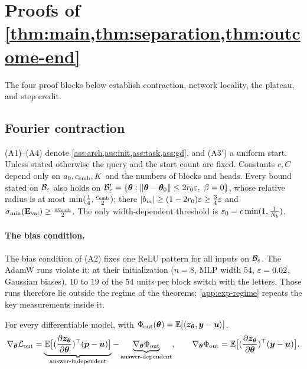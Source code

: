 \section{Proofs of \texorpdfstring{\cref{thm:main,thm:separation,thm:outcome-end}}{Theorems 1-3}}
\label{app:damping-proof}
\label{app:mainproofs}

The four proof blocks below establish contraction, network locality, the plateau, and step credit.

\subsection{Fourier contraction}
\label{app:C-fourier}
\label{app:assumptions}




(A1)--(A4) denote \cref{ass:arch,ass:init,ass:task,ass:gd}, and (A3$'$) a uniform start. Unless stated otherwise the query and the start
count are fixed. Constants $c,C$ depend only on $a_0,c_{\mathrm{emb}},K$ and the numbers of blocks and heads. Every bound stated on $\mathcal B_{\varepsilon}$ also
holds on $\initball'=\{\bm\theta:\|\bm\theta-\bm\theta_0\|\le2\ballradius\initscale,\ \beta=0\}$, whose relative radius is at most $\min(\frac{1}{4},\frac{c_{\mathrm{emb}}}{2})$; there
$|b_m|\ge(1-2r_0)\varepsilon\ge\frac{3}{4}\varepsilon$ and $\sigma_{\min}(\mathbf E_{\mathrm{val}})\ge\frac{\varepsilon c_{\mathrm{emb}}}{2}$. The only width-dependent threshold is $\varepsilon_0=c\min(1,\frac{1}{N_b})$.

\paragraph{The bias condition.}\label{rem:two-block-bias} The bias condition of (A2) fixes one ReLU pattern for all inputs on $\mathcal B_{\varepsilon}$. The AdamW runs violate it: at their initialization
($n=8$, MLP width $54$, $\varepsilon=0.02$, Gaussian biases), $10$ to $19$ of the $54$ units per block switch with the letters. Those
runs therefore lie outside the regime of the theorems; \cref{app:exp-regime} repeats the key measurements inside it.


\begin{lemma}
\label{lem:gradient-split}
For every differentiable model, with $\Phi_{\mathrm{out}}(\bm\theta)=\mathbb E[\langle\bm z_{\bm\theta},\bm y-\bm u\rangle]$,
\[
 \nabla_{\bm\theta}\Lout=\underbrace{\E\bigl[(\Jz)^\top(\bm p-\bm u)\bigr]}_{\text{answer-independent}}-\underbrace{\nabla_{\bm\theta}\outcredit}_{\text{answer-dependent}},\qquad
 \nabla_{\bm\theta}\outcredit=\E\bigl[(\Jz)^\top(\bm y-\bm u)\bigr].
\]
\end{lemma}


